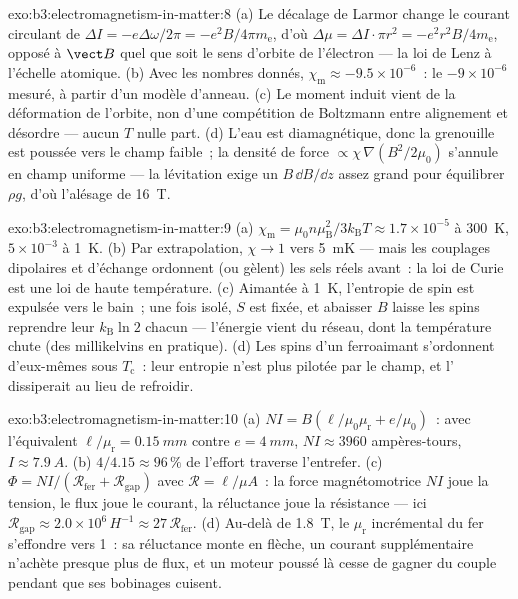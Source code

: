 \begin{solution}{exo:b3:electromagnetism-in-matter:8}
(a) Le décalage de Larmor change le courant circulant de $\Delta I
= -e\Delta\omega/2\pi = -e^2B/4\pi m_{\text{e}}$, d'où
$\Delta\mu = \Delta I\cdot\pi r^2 = -e^2r^2B/4m_{\text{e}}$,
opposé à $\vect B$ quel que soit le sens d'orbite de l'électron ---
la loi de Lenz à l'échelle atomique. (b) Avec les nombres donnés,
$\chi_{\text{m}} \approx -9.5\times10^{-6}$~: le
$-9\times10^{-6}$ mesuré, à partir d'un modèle d'anneau. (c) Le
moment induit vient de la déformation de l'orbite, non d'une
compétition de Boltzmann entre alignement et désordre --- aucun $T$
nulle part. (d) L'eau est diamagnétique, donc la grenouille est
poussée vers le champ faible~; la densité de force
$\propto \chi\,\nabla(B^2/2\mu_0)$ s'annule en champ uniforme ---
la lévitation exige un $B\,\dd B/\dd z$ assez grand pour équilibrer
$\rho g$, d'où l'alésage de \qty{16}{T}.
\end{solution}

\begin{solution}{exo:b3:electromagnetism-in-matter:9}
(a) $\chi_{\text{m}} = \mu_0n\mu_{\text{B}}^2/3k_{\text{B}}T
\approx 1.7\times10^{-5}$ à \qty{300}{K}, $5\times10^{-3}$ à
\qty{1}{K}. (b) Par extrapolation, $\chi \to 1$ vers \qty{5}{mK} ---
mais les couplages dipolaires et d'échange ordonnent (ou gèlent) les
sels réels avant~: la loi de Curie est une loi de haute température.
(c) Aimantée à \qty{1}{K}, l'entropie de spin est expulsée vers le
bain~; une fois isolé, $S$ est fixée, et abaisser $B$ laisse les
spins reprendre leur $k_{\text{B}}\ln 2$ chacun --- l'énergie vient
du réseau, dont la température chute (des millikelvins en pratique).
(d) Les spins d'un ferroaimant s'ordonnent d'eux-mêmes sous
$T_{\text{c}}$~: leur entropie n'est plus pilotée par le champ, et
l' dissiperait au lieu de refroidir.
\end{solution}

\begin{solution}{exo:b3:electromagnetism-in-matter:10}
(a) $NI = B(\ell/\mu_0\mu_{\text{r}} + e/\mu_0)$~: avec
l'équivalent $\ell/\mu_{\text{r}} = \qty{0.15}{mm}$ contre $e =
\qty{4}{mm}$, $NI \approx 3960$ ampères-tours, $I \approx
\qty{7.9}{A}$. (b) $4/4.15 \approx 96\,\%$ de l'effort traverse
l'entrefer. (c) $\Phi = NI/(\mathcal R_{\text{fer}} +
\mathcal R_{\text{gap}})$ avec $\mathcal R = \ell/\mu A$~: la force
magnétomotrice $NI$ joue la tension, le flux joue le courant, la
réluctance joue la résistance --- ici $\mathcal R_{\text{gap}}
\approx 2.0\times10^{6}\,\unit{H^{-1}} \approx
27\,\mathcal R_{\text{fer}}$. (d) Au-delà de \qty{1.8}{T}, le
$\mu_{\text{r}}$ incrémental du fer s'effondre vers 1~: sa
réluctance monte en flèche, un courant supplémentaire n'achète
presque plus de flux, et un moteur poussé là cesse de gagner du
couple pendant que ses bobinages cuisent.
\end{solution}

